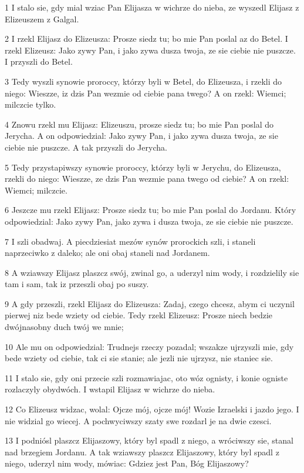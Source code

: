 \par 1 I stalo sie, gdy mial wziac Pan Elijasza w wichrze do nieba, ze wyszedl Elijasz z Elizeuszem z Galgal.
\par 2 I rzekl Elijasz do Elizeusza: Prosze siedz tu; bo mie Pan poslal az do Betel. I rzekl Elizeusz: Jako zywy Pan, i jako zywa dusza twoja, ze sie ciebie nie puszcze. I przyszli do Betel.
\par 3 Tedy wyszli synowie proroccy, którzy byli w Betel, do Elizeusza, i rzekli do niego: Wieszze, iz dzis Pan wezmie od ciebie pana twego? A on rzekl: Wiemci; milczcie tylko.
\par 4 Znowu rzekl mu Elijasz: Elizeuszu, prosze siedz tu; bo mie Pan poslal do Jerycha. A on odpowiedzial: Jako zywy Pan, i jako zywa dusza twoja, ze sie ciebie nie puszcze. A tak przyszli do Jerycha.
\par 5 Tedy przystapiwszy synowie proroccy, którzy byli w Jerychu, do Elizeusza, rzekli do niego: Wieszze, ze dzis Pan wezmie pana twego od ciebie? A on rzekl: Wiemci; milczcie.
\par 6 Jeszcze mu rzekl Elijasz: Prosze siedz tu; bo mie Pan poslal do Jordanu. Który odpowiedzial: Jako zywy Pan, jako zywa i dusza twoja, ze sie ciebie nie puszcze.
\par 7 I szli obadwaj. A piecdziesiat mezów synów prorockich szli, i staneli naprzeciwko z daleko; ale oni obaj staneli nad Jordanem.
\par 8 A wziawszy Elijasz plaszcz swój, zwinal go, a uderzyl nim wody, i rozdzielily sie tam i sam, tak iz przeszli obaj po suszy.
\par 9 A gdy przeszli, rzekl Elijasz do Elizeusza: Zadaj, czego chcesz, abym ci uczynil pierwej niz bede wziety od ciebie. Tedy rzekl Elizeusz: Prosze niech bedzie dwójnasobny duch twój we mnie;
\par 10 Ale mu on odpowiedzial: Trudnejs rzeczy pozadal; wszakze ujrzyszli mie, gdy bede wziety od ciebie, tak ci sie stanie; ale jezli nie ujrzysz, nie staniec sie.
\par 11 I stalo sie, gdy oni przecie szli rozmawiajac, oto wóz ognisty, i konie ogniste rozlaczyly obydwóch. I wstapil Elijasz w wichrze do nieba.
\par 12 Co Elizeusz widzac, wolal: Ojcze mój, ojcze mój! Wozie Izraelski i jazdo jego. I nie widzial go wiecej. A pochwyciwszy szaty swe rozdarl je na dwie czesci.
\par 13 I podniósl plaszcz Elijaszowy, który byl spadl z niego, a wróciwszy sie, stanal nad brzegiem Jordanu. A tak wziawszy plaszcz Elijaszowy, który byl spadl z niego, uderzyl nim wody, mówiac: Gdziez jest Pan, Bóg Elijaszowy?

